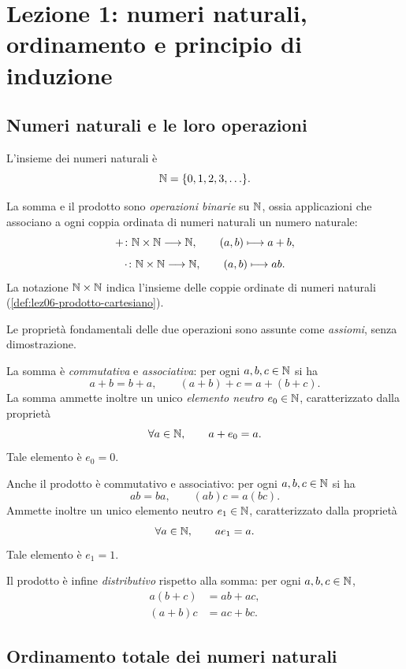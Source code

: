 \chapter[Lezione 1 --- 29 settembre 2026]{Lezione 1: numeri naturali, ordinamento e principio di induzione}
\label{chap:lezione-01}

\section{Numeri naturali e le loro operazioni}
\label{sec:lez01-numeri-naturali}

L'insieme dei numeri naturali è
\[
  \mathbb{N}=\{0,1,2,3,\ldots\}.
\]

La somma e il prodotto sono \emph{operazioni binarie} su \(\mathbb{N}\),
ossia applicazioni che associano a ogni coppia ordinata di numeri
naturali un numero naturale:
\[
  +\colon\mathbb{N}\times\mathbb{N}\longrightarrow\mathbb{N},
  \qquad (a,b)\longmapsto a+b,
\]
\[
  \cdot\colon\mathbb{N}\times\mathbb{N}\longrightarrow\mathbb{N},
  \qquad (a,b)\longmapsto ab.
\]
La notazione \(\mathbb{N}\times\mathbb{N}\) indica l'insieme delle coppie ordinate
di numeri naturali (\cref{def:lez06-prodotto-cartesiano}).

Le proprietà fondamentali delle due operazioni sono assunte come
\emph{assiomi}, senza dimostrazione.

La somma è \emph{commutativa} e \emph{associativa}: per ogni
\(a,b,c\in\mathbb{N}\) si ha
\[
  a+b=b+a,
  \qquad
  (a+b)+c=a+(b+c).
\]
La somma ammette inoltre un unico \emph{elemento neutro}
\(e_0\in\mathbb{N}\), caratterizzato dalla proprietà
\[
  \forall a\in\mathbb{N},\qquad a+e_0=a.
\]
Tale elemento è \(e_0=0\).

Anche il prodotto è commutativo e associativo: per ogni
\(a,b,c\in\mathbb{N}\) si ha
\[
  ab=ba,
  \qquad
  (ab)c=a(bc).
\]
Ammette inoltre un unico elemento neutro \(e_1\in\mathbb{N}\),
caratterizzato dalla proprietà
\[
  \forall a\in\mathbb{N},\qquad ae_1=a.
\]
Tale elemento è \(e_1=1\).

Il prodotto è infine \emph{distributivo} rispetto alla somma:
per ogni \(a,b,c\in\mathbb{N}\),
\[
  \begin{aligned}
    a(b+c) &= ab+ac,\\
    (a+b)c &= ac+bc.
  \end{aligned}
\]

\clearpage

\section{Ordinamento totale dei numeri naturali}
\label{sec:lez01-ordine-naturali}

